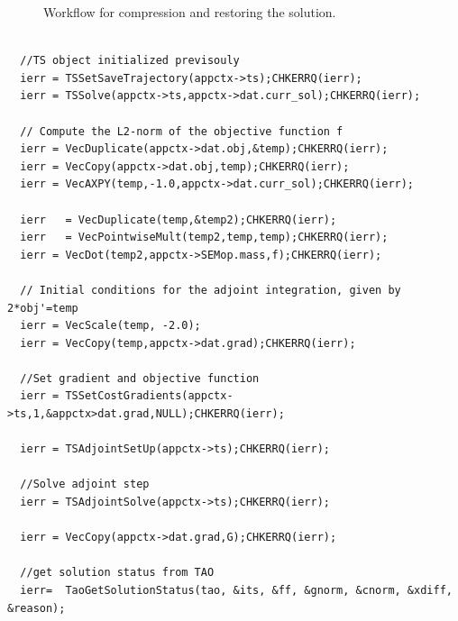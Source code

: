 \documentclass[10pt]{article}
\begin{document}
\begin{figure}
\begin{center}
\end{center}
 \caption{Workflow for compression and restoring the solution.} 
  \label{fig:algorithm}
\end{figure}
\lstset{language=C,numbers=left,
    stepnumber=5,
    showstringspaces=false,
    tabsize=2,
    breaklines=true,
    breakatwhitespace=true}
\begin{lstlisting}[caption=PETSc code for PDE constrained optimization via adjoints, label=codemat]

  //TS object initialized previsouly
  ierr = TSSetSaveTrajectory(appctx->ts);CHKERRQ(ierr);
  ierr = TSSolve(appctx->ts,appctx->dat.curr_sol);CHKERRQ(ierr);
  
  // Compute the L2-norm of the objective function f
  ierr = VecDuplicate(appctx->dat.obj,&temp);CHKERRQ(ierr);
  ierr = VecCopy(appctx->dat.obj,temp);CHKERRQ(ierr);
  ierr = VecAXPY(temp,-1.0,appctx->dat.curr_sol);CHKERRQ(ierr);
  
  ierr   = VecDuplicate(temp,&temp2);CHKERRQ(ierr);
  ierr   = VecPointwiseMult(temp2,temp,temp);CHKERRQ(ierr);
  ierr = VecDot(temp2,appctx->SEMop.mass,f);CHKERRQ(ierr);

  // Initial conditions for the adjoint integration, given by 2*obj'=temp    
  ierr = VecScale(temp, -2.0);
  ierr = VecCopy(temp,appctx->dat.grad);CHKERRQ(ierr);
  
  //Set gradient and objective function
  ierr = TSSetCostGradients(appctx->ts,1,&appctx>dat.grad,NULL);CHKERRQ(ierr);
  
  ierr = TSAdjointSetUp(appctx->ts);CHKERRQ(ierr);
     
  //Solve adjoint step
  ierr = TSAdjointSolve(appctx->ts);CHKERRQ(ierr);
   
  ierr = VecCopy(appctx->dat.grad,G);CHKERRQ(ierr);
  
  //get solution status from TAO
  ierr=  TaoGetSolutionStatus(tao, &its, &ff, &gnorm, &cnorm, &xdiff, &reason);
\end{lstlisting}
\end{document}
